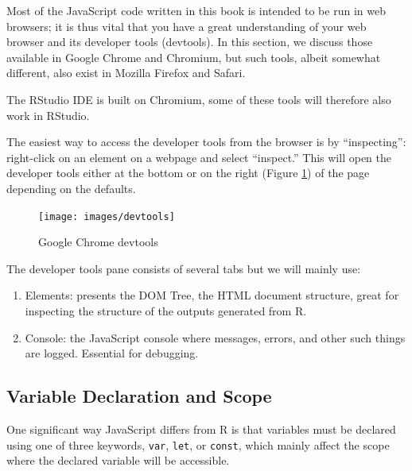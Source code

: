 \documentclass[10pt,]{krantz}
\makeatletter
\providecommand{\tightlist}{%
  \setlength{\itemsep}{0pt}\setlength{\parskip}{0pt}}
\newenvironment{kframe}{%
\medskip{}
\setlength{\fboxsep}{.8em}
 \def\at@end@of@kframe{}%
 \ifinner\ifhmode%
  \def\at@end@of@kframe{\end{minipage}}%
  \begin{minipage}{\columnwidth}%
 \fi\fi%
 \def\FrameCommand##1{\hskip\@totalleftmargin \hskip-\fboxsep
 \colorbox{shadecolor}{##1}\hskip-\fboxsep
     \hskip-\linewidth \hskip-\@totalleftmargin \hskip\columnwidth}%
 \MakeFramed {\advance\hsize-\width
   \@totalleftmargin\z@ \linewidth\hsize
   \@setminipage}}%
 {\par\unskip\endMakeFramed%
 \at@end@of@kframe}
\newenvironment{rmdblock}[1]
  {
  \begin{itemize}
  \renewcommand{\labelitemi}{
    \raisebox{-.7\height}[0pt][0pt]{
      {\setkeys{Gin}{width=3em,keepaspectratio}\texttt{[image: images/\#1]}}
    }
  }
  \setlength{\fboxsep}{1em}
  \begin{kframe}
  \item
  }
  {
  \end{kframe}
  \end{itemize}
  }
\newenvironment{rmdnote}
  {\begin{rmdblock}{note}}
  {\end{rmdblock}}
\makeatother
\begin{document}
Most of the JavaScript code written in this book is intended to be run in web browsers; it is thus vital that you have a great understanding of your web browser and its developer tools (devtools). In this section, we discuss those available in Google Chrome and Chromium, but such tools, albeit somewhat different, also exist in Mozilla Firefox and Safari.

\begin{rmdnote}
The RStudio IDE is built on Chromium, some of these tools
will therefore also work in RStudio.
\end{rmdnote}

The easiest way to access the developer tools from the browser is by ``inspecting'': right-click on an element on a webpage and select ``inspect.'' This will open the developer tools either at the bottom or on the right (Figure \ref{fig:chrome-devtools}) of the page depending on the defaults.

\begin{figure}[H]

{\centering \texttt{[image: images/devtools]} 

}

\caption{Google Chrome devtools}\label{fig:chrome-devtools}
\end{figure}

The developer tools pane consists of several tabs but we will mainly use:

\begin{enumerate}
\def\labelenumi{\arabic{enumi}.}
\tightlist
\item
  Elements: presents the DOM Tree, the HTML document structure, great for inspecting the structure of the outputs generated from R.
\item
  Console: the JavaScript console where messages, errors, and other such things are logged. Essential for debugging.
\end{enumerate}

\hypertarget{basics-var-scope}{%
\subsection{Variable Declaration and Scope}\label{basics-var-scope}}

One significant way JavaScript differs from R is that variables must be declared using one of three keywords, \texttt{var}, \texttt{let}, or \texttt{const}, which mainly affect the scope where the declared variable will be accessible.
\end{document}
